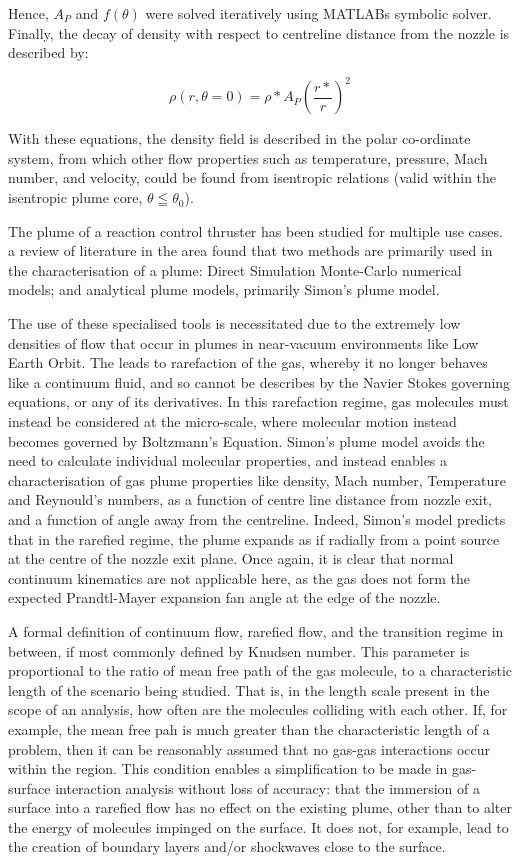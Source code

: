 \documentclass[journal]{new-aiaa}
\begin{document}
Hence, $A_P$ and $f(\theta)$ were solved iteratively using MATLABs symbolic solver. Finally, the decay of density with respect to centreline distance from the nozzle is described by:

\begin{equation}
    \rho (r, \theta=0) = \rho* A_P \left( \frac{r*}{r} \right) ^{2}
\end{equation}

With these equations, the density field is described in the polar co-ordinate system, from which other flow properties such as temperature, pressure, Mach number, and velocity, could be found from isentropic relations (valid within the isentropic plume core, $\theta \leqq \theta_0$).

The plume of a reaction control thruster has been studied for multiple use cases. a review of literature in the area found that two methods are primarily used in the characterisation of a plume: Direct Simulation Monte-Carlo numerical models; and analytical plume models, primarily Simon's plume model.

The use of these specialised tools is necessitated due to the extremely low densities of flow that occur in plumes in near-vacuum environments like Low Earth Orbit. The leads to rarefaction of the gas, whereby it no longer behaves like a continuum fluid, and so cannot be describes by the Navier Stokes governing equations, or any of its derivatives. In this rarefaction regime, gas molecules must instead be considered at the micro-scale, where molecular motion instead becomes governed by Boltzmann's Equation. Simon's plume model avoids the need to calculate individual molecular properties, and instead enables a characterisation of gas plume properties like density, Mach number, Temperature and Reynould's numbers, as a function of centre line distance from nozzle exit, and a function of angle away from the centreline. Indeed, Simon's model predicts that in the rarefied regime, the plume expands as if radially from a point source at the centre of the nozzle exit plane. Once again, it is clear that normal continuum kinematics are not applicable here, as the gas does not form the expected Prandtl-Mayer expansion fan angle at the edge of the nozzle. 

A formal definition of continuum flow, rarefied flow, and the transition regime in between, if most commonly defined by Knudsen number. This parameter is proportional to the ratio of mean free path of the gas molecule, to a characteristic length of the scenario being studied. That is, in the length scale present in the scope of an analysis, how often are the molecules colliding with each other. If, for example, the mean free pah is much greater than the characteristic length of a problem, then it can be reasonably assumed that no gas-gas interactions occur within the region. This condition enables a simplification to be made in gas-surface interaction analysis without loss of accuracy: that the immersion of a surface into a rarefied flow has no effect on the existing plume, other than to alter the energy of molecules impinged on the surface. It does not, for example, lead to the creation of boundary layers and/or shockwaves close to the surface.
\end{document}
